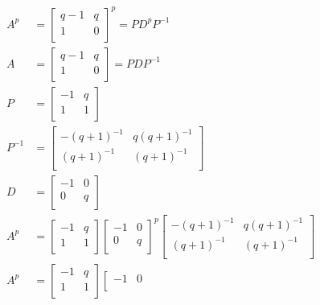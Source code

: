 \documentclass[paper.tex]{subfiles}
\begin{document}
\begin{align*}
A^{p} &= 
\left[ \begin{array}{ccc}
q-1 & q \\
1 & 0 \\
\end{array} \right] ^{p}
=
PD^{p}P^{-1} \\ 
A &= 
\left[ \begin{array}{ccc}
q-1 & q \\
1 & 0 \\
\end{array} \right]
=
PDP^{-1} \\ 
P &= 
\left[ \begin{array}{ccc}
-1 & q \\
1 & 1 \\
\end{array} \right] \\
P^{-1} &=
\left[ \begin{array}{ccc}
-(q+1)^{-1} & q(q+1)^{-1} \\
(q+1)^{-1} & (q+1)^{-1} \\
\end{array} \right] \\
D &= 
\left[ \begin{array}{ccc}
-1 & 0 \\
0 & q \\
\end{array} \right] \\ 
A^{p}
&=
\left[ \begin{array}{ccc}
-1 & q \\
1 & 1 \\
\end{array} \right]
\left[ \begin{array}{ccc}
-1 & 0 \\
0 & q \\
\end{array} \right] ^{p}
\left[ \begin{array}{ccc}
-(q+1)^{-1} & q(q+1)^{-1} \\
(q+1)^{-1} & (q+1)^{-1} \\
\end{array} \right] \\
A^{p}
&=
\left[ \begin{array}{ccc}
-1 & q \\
1 & 1 \\
\end{array} \right]
\left[ \begin{array}{ccc}
-1 & 0 \\

\end{array}
\end{align*}
\end{document}
